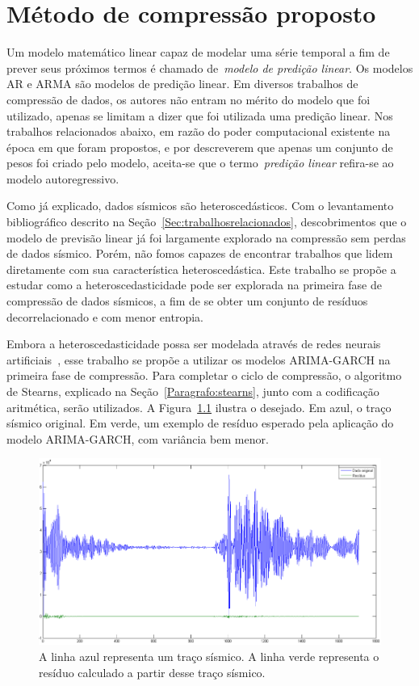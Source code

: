 \chapter{Método de compressão proposto}
\label{Capitulo:propostatrabalho}

Um modelo matemático linear capaz de modelar uma série temporal a fim de
prever seus próximos termos é chamado de~\emph{modelo de predição linear}. Os
modelos AR e ARMA são modelos de predição linear. Em
diversos trabalhos de compressão de dados, os autores não entram no mérito do
modelo que foi utilizado, apenas se limitam a dizer que foi utilizada uma
predição linear. Nos trabalhos relacionados abaixo, em razão do poder
computacional existente na época em que foram propostos, e por descreverem que
apenas um conjunto de pesos foi criado pelo modelo, aceita-se que o
termo~\emph{predição linear} refira-se ao modelo autoregressivo.

Como já explicado, dados sísmicos são heteroscedásticos. Com o levantamento
bibliográfico descrito na Seção~\ref{Sec:trabalhosrelacionados}, descobrimentos
que o modelo de previsão linear já foi largamente explorado na compressão sem
perdas de dados sísmico. Porém, não fomos capazes de encontrar trabalhos que
lidem diretamente com sua característica heteroscedástica. Este trabalho se
propõe a estudar como a heteroscedasticidade pode ser explorada na primeira fase
de compressão de dados sísmicos, a fim de se obter um conjunto de resíduos
decorrelacionado e com menor entropia. 

Embora a heteroscedasticidade possa ser modelada através de redes neurais
artificiais~\citep{Artigo:rnheteros}, esse trabalho se propõe a utilizar os
modelos ARIMA-GARCH na primeira fase de compressão. Para completar o ciclo de
compressão, o algoritmo de Stearns, explicado na
Seção~\ref{Paragrafo:stearns}, junto com a codificação aritmética, serão
utilizados. A Figura~\ref{fig:tracoeresiduo} ilustra o desejado. Em azul, o
traço sísmico original. Em verde, um exemplo de resíduo esperado pela aplicação
do modelo ARIMA-GARCH, com variância bem menor.

\begin{figure}[ht]
\centering
\includegraphics[scale=0.65]{fig/tracoeresiduo.png}
\caption{A linha azul representa um traço sísmico. A linha verde representa o
resíduo calculado a partir desse traço sísmico.}
\label{fig:tracoeresiduo}
\end{figure}

